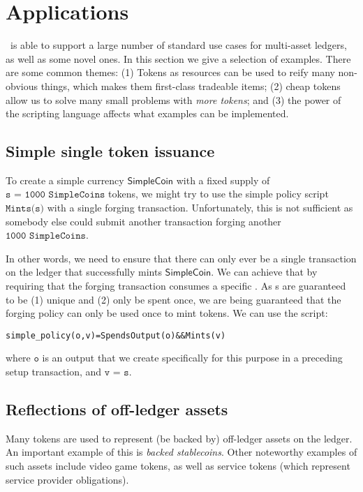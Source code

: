 \section{Applications}
\label{sec:applications}

\UTXOma\ is able to support a large number of standard use cases for multi-asset ledgers, as well as some novel ones.
In this section we give a selection of examples.
There are some common themes: (1) Tokens as resources can be used to reify many non-obvious things, which makes them first-class tradeable items; (2) cheap tokens allow us to solve many small problems with \emph{more tokens}; and (3) the power of the scripting language affects what examples can be implemented.

\subsection{Simple single token issuance}
%
To create a simple currency $\mathsf{SimpleCoin}$ with a fixed supply of $\texttt{s = 1000 SimpleCoins}$ tokens, we might try to use the simple policy script $\texttt{Mints(s)}$ with a single forging transaction. Unfortunately, this is not sufficient as somebody else could submit another transaction forging another $\texttt{1000 SimpleCoins}$.

In other words, we need to ensure that there can only ever be a single transaction on the ledger that successfully mints $\mathsf{SimpleCoin}$. We can achieve that by requiring that the forging transaction consumes a specific \UTXO. As \UTXO{}s are guaranteed to be (1) unique and (2) only be spent once, we are being guaranteed that the forging policy can only be used once to mint tokens. We can use the script:

\begin{alltt}
  simple_policy(o, v) = SpendsOutput(o) && Mints(v)
\end{alltt}

\noindent where $\texttt{o}$ is an output that we create specifically for this purpose in a preceding setup transaction, and $\texttt{v = s}$.

\subsection{Reflections of off-ledger assets}
\label{sec:asset-tokens}

Many tokens are used to represent (be backed by) off-ledger assets on the ledger. An
important example of this is \emph{backed stablecoins}. Other noteworthy
examples of such assets include video game tokens, as well as service
tokens (which represent service provider obligations).

